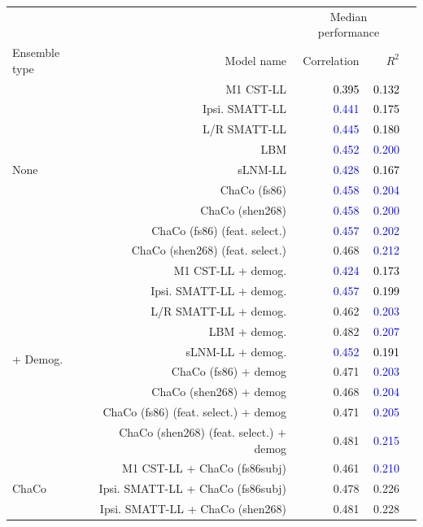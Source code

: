 \documentclass[10pt]{article}
\newcommand{\colorNavyBlue}[1]{\textcolor{NavyBlue}{#1}}
\newcommand{\colorBlack}[1]{\textcolor{Black}{#1}}
\newcommand{\colorBlue}[1]{\textcolor{Blue}{#1}}
\begin{document}
\begin{table}[h]
\centering
\begin{tabular}{lrrrr}
\toprule
 &  & \multicolumn{2}{c}{Median performance} \\
Ensemble type & Model name & Correlation & $R^2$  \\
\midrule\multirow[t]{9}{*}{None} & M1 CST-LL & \colorBlack{0.395} & \colorBlack{0.132} \\
 & Ipsi. SMATT-LL & \colorBlue{0.441} & \colorBlack{0.175} \\
 & L/R SMATT-LL & \colorBlue{0.445} & \colorBlack{0.180} \\
 & LBM & \colorBlue{0.452} & \colorBlue{0.200} \\
 & sLNM-LL & \colorBlue{0.428} & \colorBlack{0.167} \\
 & ChaCo (fs86) & \colorBlue{0.458} & \colorBlue{0.204} \\
 & ChaCo (shen268) & \colorBlue{0.458} & \colorBlue{0.200} \\
 & ChaCo (fs86) (feat. select.) & \colorBlue{0.457} & \colorBlue{0.202} \\
 & ChaCo (shen268) (feat. select.) & \colorNavyBlue{0.468} & \colorBlue{0.212} \\
\multirow[t]{9}{*}{+ Demog.} & M1 CST-LL + demog. & \colorBlue{0.424} & \colorBlack{0.173} \\
 & Ipsi. SMATT-LL + demog. & \colorBlue{0.457} & \colorBlack{0.199} \\
 & L/R SMATT-LL + demog. & \colorNavyBlue{0.462} & \colorBlue{0.203} \\
 & LBM + demog. & \colorNavyBlue{0.482} & \colorBlue{0.207} \\
 & sLNM-LL + demog. & \colorBlue{0.452} & \colorBlack{0.191} \\
 & ChaCo (fs86) + demog & \colorNavyBlue{0.471} & \colorBlue{0.203} \\
 & ChaCo (shen268) + demog & \colorNavyBlue{0.468} & \colorBlue{0.204} \\
 & ChaCo (fs86) (feat. select.) + demog & \colorNavyBlue{0.471} & \colorBlue{0.205} \\
 & ChaCo (shen268) (feat. select.) + demog & \colorNavyBlue{0.481} & \colorBlue{0.215} \\
\multirow[t]{20}{*}{ChaCo} & M1 CST-LL + ChaCo (fs86subj) & \colorNavyBlue{0.461} & \colorBlue{0.210} \\
 & Ipsi. SMATT-LL + ChaCo (fs86subj) & \colorNavyBlue{0.478} & \colorNavyBlue{0.226} \\
 & Ipsi. SMATT-LL + ChaCo (shen268) & \colorNavyBlue{0.481} & \colorNavyBlue{0.228} \\

\end{tabular}
\end{table}
\end{document}
